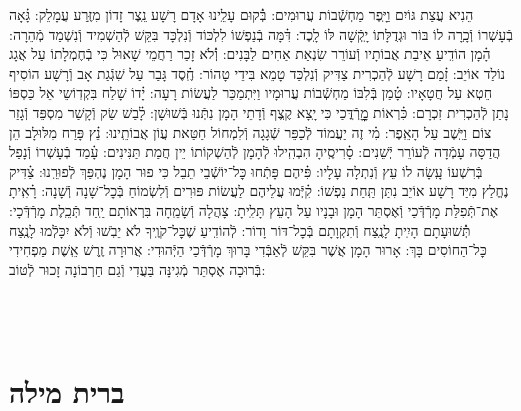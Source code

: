 \documentclass[twoside, openany, parskip=half, 11pt]{book}
\begin{document}
הֵנִיא עֲצַת גּוֹיִם וַיָּֽפֶר מַחְשְֿׁבוֹת עֲרוּמִים: \hfill \break
בְּֿ֗קוּם עָלֵֽינוּ אָדָם רָשָׁע נֵֽצֶר זָדוֹן מִזֶּֽרַע עֲמָלֵק: \hfill \break
גָּ֗אָה בְֿעָשְׁרוֹ וְֿכָֽרָה לוֹ בּוֹר וּגְדֻלָּתוֹ יָֽקְֿשָׁה לּוֹ לָֽכֶד: \hfill \break
דִּ֗מָּה בְֿנַפְשׁוֹ לִלְכּוֹד וְֿנִלְכָּד בִּקֵּשׁ לְֿהַשְׁמִיד וְֿנִשְׁמַד מְֿהֵרָה: \hfill \break
הָ֗מָן הוֹדִֽיעַ אֵיבַת אֲבוֹתָיו וְֿעוֹרֵר שִׂנְאַת אַחִים לַבָּנִים: \hfill \break
וְֿ֗לֹא זָכַר רַחֲמֵי שָׁאוּל כִּי בְֿחֶמְלָתוֹ עַל אֲגָג נוֹלַד אוֹיֵב: \hfill \break
זָ֗מַם רָשָׁע לְֿהַכְרִית צַדִּיק וְֿנִלְכַּד טָמֵא בִּידֵי טָהוֹר: \hfill \break
חֶֽ֗סֶד גָּבַר עַל שִׁגְֿגַת אָב וְֿרָשָׁע הוֹסִיף חֵטְא עַל חֲטָאָיו: \hfill \break
טָ֗מַן בְּֿלִבּוֹ מַחְשְֿׁבוֹת עֲרוּמָיו וַיִּתְמַכֵּר לַעֲשׂוֹת רָעָה: \hfill \break
יָ֗דוֹ שָׁלַח בִּקְדֽוֹשֵי אֵל כַּסְפּוֹ נָתַן לְֿהַכְרִית זִכְרָם: \hfill \break
כִּ֗רְאוֹת מׇׇׇׇׇׇָרְֿדֳּכַי כִּי יָֽצָא קֶֽצֶף וְֿדָתֵי הָמָן נִתְּֿנוּ בְּֿשׁוּשָׁן: \hfill \break
לָ֗בַשׁ שַׂק וְֿקָשַׁר מִסְפֵּד וְֿגָזַר צוֹם וַיֵּֽשֶׁב עַל הָאֵֽפֶר: \hfill \break
מִ֗י זֶה יַעֲמוֹד לְֿכַפֵּר שְֿׁגָגָה וְֿלִמְחוֹל חַטַּאת עֲוֹן אֲבוֹתֵֽינוּ: \hfill \break
נֵ֗ץ פָּרַח מִלּוּלָב הֵן הֲדַסָּה עָמְֿדָה לְֿעוֹרֵר יְֿשֵׁנִים: \hfill \break
סָ֗רִיסֶֽיהָ הִבְהִֽילוּ לְֿהָמָן לְֿהַשְׁקוֹתוֹ יֵין חֲמַת תַּנִּינִים: \hfill \break
עָ֗מַד בְֿעָשְׁרוֹ וְֿנָפַל בְּֿרִשְׁעוֹ עָֽשָׂה לוֹ עֵץ וְֿנִתְלָה עָלָיו: \hfill \break
פִּ֗יהֶם פָּתְֿחוּ כׇּל־יוֹשְֿׁבֵי תֵבֵל כִּי פוּר הָמָן נֶהְפַּךְ לְֿפוּרֵֽנוּ: \hfill \break
צַ֗דִּיק נֶחֱלַץ מִיַּד רָשָׁע אוֹיֵב נִתַּן תַּֽחַת נַפְשׁוֹ: \hfill \break
קִ֗יְּֿמוּ עֲלֵיהֶם לַעֲשׂוֹת פּוּרִים וְֿלִשְׂמוֹחַ בְּֿכׇל־שָׁנָה וְֿשָׁנָה: \hfill \break
רָ֗אִֽיתָ אֶת־תְּֿפִלַּת מָרְֿדְּֿכַי וְֿאֶסְתֵּר הָמָן וּבָנָיו עַל הָעֵץ תָּלִֽיתָ: \hfill \break
{}
צָהֲלָה וְֿשָׂמֵֽחָה בִּרְאוֹתָם יַֽחַד תְּֿכֵֽלֶת מָרְֿדְּֿכָי: \hfill \break
תְּֿ֗שׁוּעָתָם הָיִֽיתָ לָנֶֽצַח וְֿתִקְוָתָם בְּֿכׇל־דּוֹר וָדוֹר: \hfill \break
לְֿהוֹדִֽיעַ שֶׁכׇּל־קֹוֶֽיךָ לֹא יֵבֹֽשׁוּ וְֿלֹא יִכָּלְֿמוּ לָנֶֽצַח כׇּל־הַחוֹסִים בָּךְ: \hfill \break
אָרוּר הָמָן אֲשֶׁר בִּקֵּשׁ לְֿאַבְּֿדִי בָּרוּךְ מָרְֿדְּֿכַי הַיְּֿהוּדִי: \hfill \break
אֲרוּרָה זֶֽרֶשׁ אֵֽשֶׁת מַפְחִידִי בְּֿרוּכָה אֶסְתֵּר מְֿגִינָּה בַּעֲדִי וְֿגַם חַרְבוֹנָה זָכוּר לְֿטּוֹב:

\vfill
{}\\
\\


\sepline



\chapter[ברית מילה]{ ברית מילה }
\end{document}
